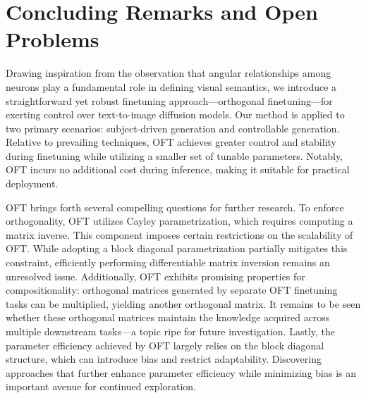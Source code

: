\section{Concluding Remarks and Open Problems}

Drawing inspiration from the observation that angular relationships among neurons play a fundamental role in defining visual semantics, we introduce a straightforward yet robust finetuning approach—orthogonal finetuning—for exerting control over text-to-image diffusion models. Our method is applied to two primary scenarios: subject-driven generation and controllable generation. Relative to prevailing techniques, OFT achieves greater control and stability during finetuning while utilizing a smaller set of tunable parameters. Notably, OFT incurs no additional cost during inference, making it suitable for practical deployment.

OFT brings forth several compelling questions for further research. To enforce orthogonality, OFT utilizes Cayley parametrization, which requires computing a matrix inverse. This component imposes certain restrictions on the scalability of OFT. While adopting a block diagonal parametrization partially mitigates this constraint, efficiently performing differentiable matrix inversion remains an unresolved issue. Additionally, OFT exhibits promising properties for compositionality: orthogonal matrices generated by separate OFT finetuning tasks can be multiplied, yielding another orthogonal matrix. It remains to be seen whether these orthogonal matrices maintain the knowledge acquired across multiple downstream tasks—a topic ripe for future investigation. Lastly, the parameter efficiency achieved by OFT largely relies on the block diagonal structure, which can introduce bias and restrict adaptability. Discovering approaches that further enhance parameter efficiency while minimizing bias is an important avenue for continued exploration.